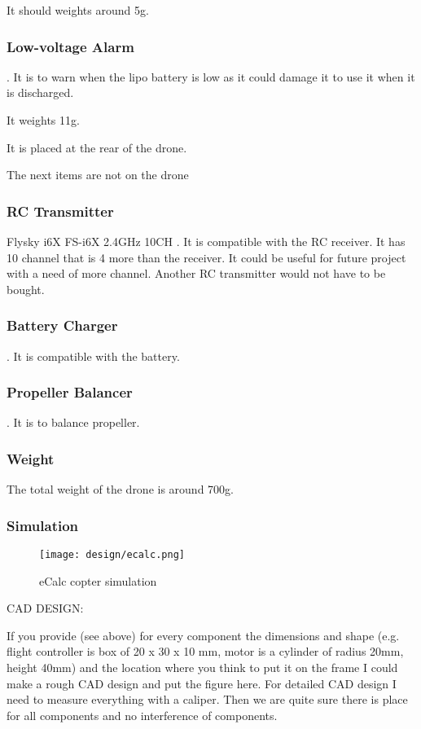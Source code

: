 It should weights around 5g.

\subsubsection{Low-voltage Alarm}
\cite{bangood_battery_monitor}. It is to warn when the lipo battery is low as it could damage it to use it when it is discharged.

It weights 11g.

It is placed at the rear of the drone.

{\color{blue}The next items are not on the drone}

\subsubsection{RC Transmitter}
Flysky i6X FS-i6X 2.4GHz 10CH \cite{bangood_transmitter}. It is compatible with the RC receiver. It has 10 channel that is 4 more than the receiver. It could be useful for future project with a need of more channel. Another RC transmitter would not have to be bought.

\subsubsection{Battery Charger}
\cite{bangood_battery_charger}. It is compatible with the battery.

\subsubsection{Propeller Balancer}
\cite{bangood_prop_balancer}. It is to balance propeller.

\subsubsection{Weight}
The total weight of the drone is around 700g.

\subsubsection{Simulation}
\begin{figure}[!ht]
    \centering
    \texttt{[image: design/ecalc.png]}
    \caption{eCalc copter simulation}
    \label{fig:ecalc}
\end{figure}


CAD DESIGN:

If you provide (see above) for every component the dimensions and shape (e.g. flight controller is box of 20 x 30 x 10 mm, motor is a cylinder of radius 20mm, height 40mm) and the location where you think to put it on the frame I could make a rough CAD design and put the figure here. For detailed CAD design I need to measure everything with a caliper. Then we are quite sure there is place for all components and no interference of components.



